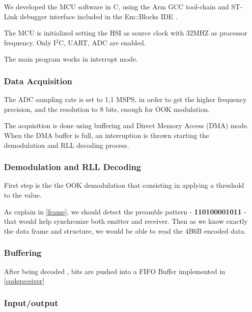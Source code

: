 We developed the MCU software in C, using the Arm GCC tool-chain and ST-Link debugger interface included in the Em::Blocks IDE \citep{emblocks}.

The MCU is initialized setting the HSI as source clock with 32MHZ as processor frequency. Only I$^2$C, UART, ADC are enabled.

The main program works in interrupt mode. 

\subsubsection{Data Acquisition}

The ADC sampling rate is set to 1,1 MSPS, in order to get the higher frequency precision, and the resolution to 8 bits, enough for OOK modulation.

The acquisition is done using buffering and Direct Memory Access (DMA) mode. 
When the DMA buffer is full, an interruption is thrown starting the demodulation and RLL decoding process.

\subsubsection{Demodulation and RLL Decoding}

First step is the the OOK demodulation that consisting in applying a threshold to the value.



As explain in \ref{frame}, we should detect the preamble pattern - \textbf{110100001011} - that would help synchronize both emitter and receiver.
Then as we know exactly the data frame and structure, we would be able to read the 4B6B encoded data.


\subsubsection{Buffering}


After being decoded , bits are pushed into a FIFO Buffer implemented in \ref{codereceiver}



\subsubsection{Input/output}
 
